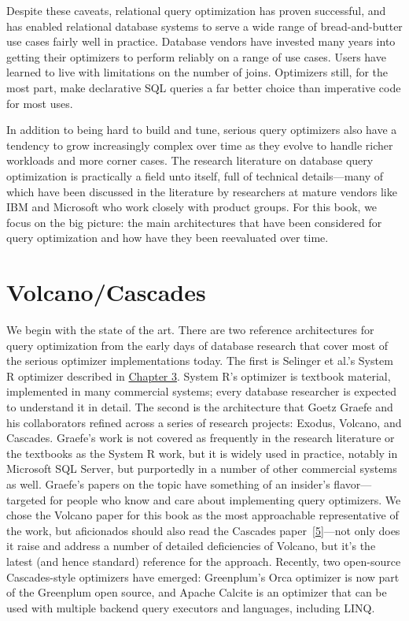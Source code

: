 \documentclass[b5paper,11pt,twoside,openright]{book}
\newcommand\Section[2]{
  \hypertarget{#1}{
    \section{#2}
  }
}
\begin{document}
Despite these caveats, relational query optimization has proven
successful, and has enabled relational database systems to serve a wide
range of bread-and-butter use cases fairly well in practice. Database
vendors have invested many years into getting their optimizers to
perform reliably on a range of use cases. Users have learned to live
with limitations on the number of joins. Optimizers still, for the most
part, make declarative SQL queries a far better choice than imperative
code for most uses.

In addition to being hard to build and tune, serious query optimizers
also have a tendency to grow increasingly complex over time as they
evolve to handle richer workloads and more corner cases. The research
literature on database query optimization is practically a field unto
itself, full of technical details---many of which have been discussed in
the literature by researchers at mature vendors like IBM and Microsoft
who work closely with product groups. For this book, we focus on the big
picture: the main architectures that have been considered for query
optimization and how have they been reevaluated over time.

\Section{volcanocascades}{%
Volcano/Cascades
}

We begin with the state of the art. There are two reference
architectures for query optimization from the early days of database
research that cover most of the serious optimizer implementations today.
The first is Selinger et al.'s System R optimizer described in
\hyperref[ch3-techniques]{Chapter 3}. System R's optimizer is textbook
material, implemented in many commercial systems; every database
researcher is expected to understand it in detail. The second is the
architecture that Goetz Graefe and his collaborators refined across a
series of research projects: Exodus, Volcano, and Cascades. Graefe's
work is not covered as frequently in the research literature or the
textbooks as the System R work, but it is widely used in practice,
notably in Microsoft SQL Server, but purportedly in a number of other
commercial systems as well. Graefe's papers on the topic have something
of an insider's flavor---targeted for people who know and care about
implementing query optimizers. We chose the Volcano paper for this book
as the most approachable representative of the work, but aficionados
should also read the Cascades
paper~{{[}\protect\hyperlink{ref-graefe1995cascades}{5}{]}}---not only
does it raise and address a number of detailed deficiencies of Volcano,
but it's the latest (and hence standard) reference for the approach.
Recently, two open-source Cascades-style optimizers have emerged:
Greenplum's Orca optimizer is now part of the Greenplum open source, and
Apache Calcite is an optimizer that can be used with multiple backend
query executors and languages, including LINQ.
\end{document}
